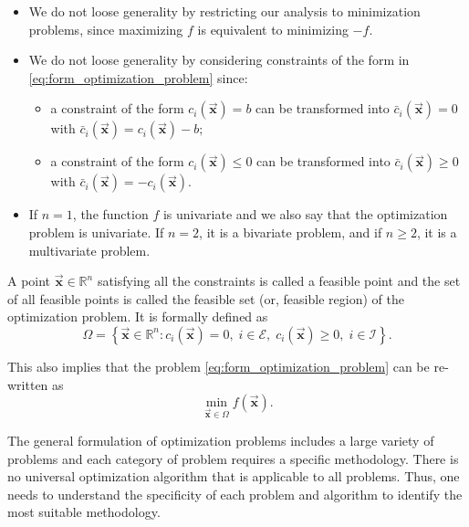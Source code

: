 \documentclass[9pt, headings=standardclasses, parskip=half]{scrartcl}
\renewcommand{\emph}[1]{\textcolor{mypurple}{#1}}
\newcommand{\vect}[1]{\vec{\boldsymbol{#1}}}
\begin{document}
\begin{remark}\leavevmode
  \begin{itemize}
    \item We do not loose generality by restricting our analysis to minimization problems, since maximizing \(f\) is \emph{equivalent to} minimizing \(-f\).
    \item We do not loose generality by considering constraints of the form in \eqref{eq:form_optimization_problem} since:
    \begin{itemize}
      \item a constraint of the form \(c_{i}(\vect{x})=b\) can be transformed into \(\bar{c}_{i}(\vect{x})=0\) with \(\bar{c}_{i}(\vect{x})=c_{i}(\vect{x})-b ;\)
      \item a constraint of the form \(c_{i}(\vect{x}) \leq 0\) can be transformed into \(\bar{c}_{i}(\vect{x}) \geq 0\) with \(\bar{c}_{i}(\vect{x})=-c_{i}(\vect{x})\).
    \end{itemize}
    \item If \(n=1\), the function \(f\) is \emph{univariate} and we also say that the optimization problem is univariate. If \(n=2\), it is a \emph{bivariate} problem, and if \(n \geq 2\), it is a \emph{multivariate} problem. 
  \end{itemize}
\end{remark}

A point \(\vect{x}\in\mathbb{R}^{n}\) satisfying all the constraints is called a \emph{feasible point} and the set of all feasible points is called the \emph{feasible set} (or, feasible region) of the optimization problem. It is formally defined as
\begin{equation}
  \label{eq:feasible_set}
\Omega = \left\{ \vect{x}\in\mathbb{R}^{n} : c_{i}(\vect{x})=0,\; i\in\mathcal{E},\; c_{i}(\vect{x})\geq 0,\; i\in\mathcal{I} \right\}.
\end{equation}

This also implies that the problem \eqref{eq:form_optimization_problem} can be re-written as
\[
\min_{\vect{x}\in\Omega} f(\vect{x}).
\]

The general formulation of optimization problems includes a large variety of problems and each category of problem requires a specific methodology. There is no universal optimization algorithm that is applicable to all problems. Thus, one needs to understand the specificity of each problem and algorithm to identify the most suitable methodology.
\end{document}
